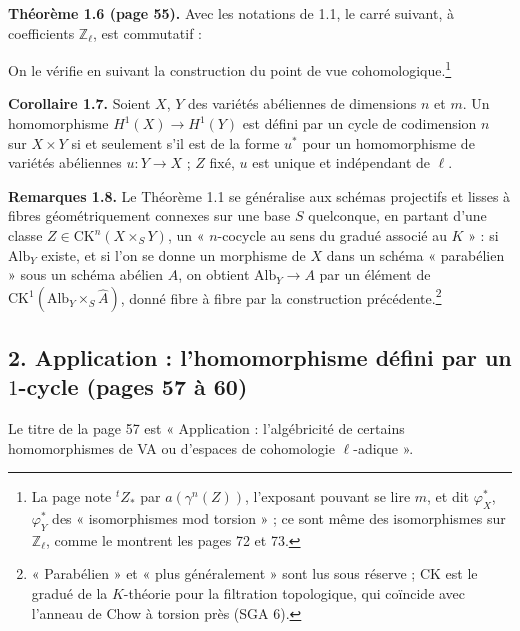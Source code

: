 \documentclass[11pt,a4paper]{article}
\begin{document}
\textbf{Théorème 1.6 (page 55).} Avec les notations de 1.1, le carré suivant,
à coefficients $\mathbb{Z}_{\ell}$, est commutatif :


On le vérifie en suivant la construction du point de vue
cohomologique.\footnote{La page note ${}^{t}Z_{*}$ par $a(\gamma^{n}(Z))$,
l'exposant pouvant se lire $m$, et dit $\varphi_{X}^{*}$, $\varphi_{Y}^{*}$ des
« isomorphismes mod torsion » ; ce sont même des isomorphismes sur
$\mathbb{Z}_{\ell}$, comme le montrent les pages 72 et 73.}

\textbf{Corollaire 1.7.} Soient $X$, $Y$ des variétés abéliennes de dimensions
$n$ et $m$. Un homomorphisme $H^{1}(X) \to H^{1}(Y)$ est défini par un cycle de
codimension $n$ sur $X \times Y$ si et seulement s'il est de la forme $u^{*}$
pour un homomorphisme de variétés abéliennes $u \colon Y \to X$ ; $Z$ fixé, $u$
est unique et indépendant de $\ell$.

\textbf{Remarques 1.8.} Le Théorème 1.1 se généralise aux schémas projectifs et
lisses à fibres géométriquement connexes sur une base $S$ quelconque, en partant
d'une classe $Z \in \mathrm{CK}^{n}(X \times_{S} Y)$, un « $n$-cocycle au sens
du gradué associé au $K$ » : si $\mathrm{Alb}_{Y}$ existe, et si l'on se donne un
morphisme de $X$ dans un schéma « parabélien » sous un schéma abélien $A$, on
obtient $\mathrm{Alb}_{Y} \to A$ par un élément de $\mathrm{CK}^{1}(\mathrm{Alb}_{Y}
\times_{S} \hat{A})$, donné fibre à fibre par la construction
précédente.\footnote{« Parabélien » et « plus généralement » sont lus sous
réserve ; $\mathrm{CK}$ est le gradué de la $K$-théorie pour la filtration
topologique, qui coïncide avec l'anneau de Chow à torsion près (SGA 6).}

\subsection*{2. Application : l'homomorphisme défini par un $1$-cycle (pages 57
à 60)}

Le titre de la page 57 est « Application : l'algébricité de certains
homomorphismes de VA ou d'espaces de cohomologie $\ell$-adique ».
\end{document}
